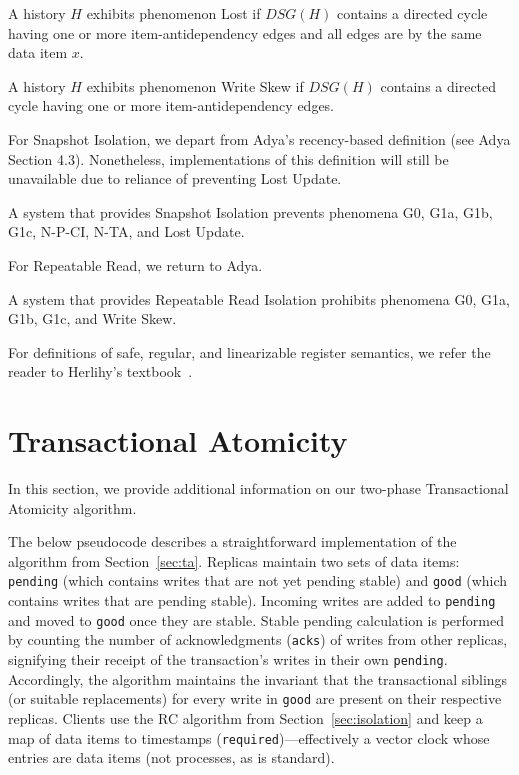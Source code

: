 \begin{definition}
A history $H$ exhibits phenomenon Lost if $DSG(H)$ contains a directed
cycle having one or more item-antidependency edges and all edges are
by the same data item $x$.
\label{def:lostupdate}
\end{definition}

\begin{definition}
A history $H$ exhibits phenomenon Write Skew if $DSG(H)$ contains a directed
cycle having one or more item-antidependency edges.
\end{definition}

For Snapshot Isolation, we depart from Adya's recency-based definition
(see Adya Section 4.3). Nonetheless, implementations of this
definition will still be unavailable due to reliance of preventing
Lost Update.

\begin{definition}
A system that provides Snapshot Isolation prevents phenomena G0, G1a,
G1b, G1c, N-P-CI, N-TA, and Lost Update.
\end{definition}

For Repeatable Read, we return to Adya.

\begin{definition}
A system that provides Repeatable Read Isolation prohibits phenomena
G0, G1a, G1b, G1c, and Write Skew.
\end{definition}

For definitions of safe, regular, and linearizable register semantics,
we refer the reader to Herlihy's textbook~\cite{herlihy-art}.

\section{Transactional Atomicity}

In this section, we provide additional information on our two-phase
Transactional Atomicity algorithm.

The below pseudocode describes a straightforward implementation of the
algorithm from Section~\ref{sec:ta}. Replicas maintain two sets of
data items: \texttt{pending} (which contains writes that are not yet
pending stable) and \texttt{good} (which contains writes that are
pending stable). Incoming writes are added to \texttt{pending} and
moved to \texttt{good} once they are stable. Stable pending
calculation is performed by counting the number of acknowledgments
(\texttt{acks}) of writes from other replicas, signifying their
receipt of the transaction's writes in their
own \texttt{pending}. Accordingly, the algorithm maintains the
invariant that the transactional siblings (or suitable replacements)
for every write in \texttt{good} are present on their respective
replicas. Clients use the RC algorithm from
Section~\ref{sec:isolation} and keep a map of data items to timestamps
(\texttt{required})---effectively a vector clock whose entries are
data items (not processes, as is standard).


